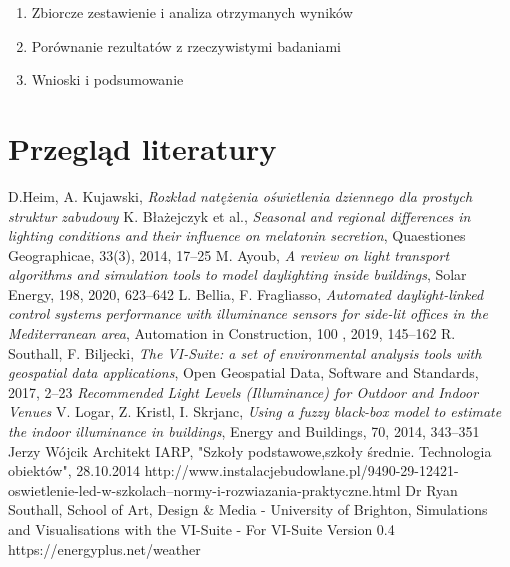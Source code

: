 \documentclass[a4paper,12pt]{article}
\begin{document}
\begin{enumerate}
\begin{table}[h]
\begin{center}
\begin{tabular}{|c|c|c|c|c|c|c|c|c|c|c|c|c|c|c|}
				\end{tabular}
			\end{center}
		\end{table}
		
		
		\item Zbiorcze zestawienie i analiza otrzymanych wyników 
		\item Porównanie rezultatów z rzeczywistymi badaniami
		\item Wnioski i podsumowanie
		
	\end{enumerate}
	
	\section{Przegląd literatury}
	\label{sec:przeglad_literatury}
	\begin{thebibliography}{7}
		D.Heim, A. Kujawski, \textit{Rozkład natężenia oświetlenia dziennego dla prostych struktur zabudowy}
		K. Błażejczyk et al., \textit{Seasonal and regional differences in lighting conditions and their influence on melatonin secretion}, Quaestiones Geographicae, 33(3), 2014, 17--25
		M. Ayoub, \textit{A review on light transport algorithms and simulation tools to model daylighting inside buildings}, Solar Energy, 198, 2020, 623--642
		L. Bellia, F. Fragliasso, \textit{Automated daylight-linked control systems performance with illuminance sensors for side-lit offices in the Mediterranean area}, Automation in Construction, 100 , 2019, 145--162
		R. Southall, F. Biljecki, \textit{The VI-Suite: a set of environmental analysis tools with geospatial data applications}, Open Geospatial Data, Software and Standards, 2017, 2--23
		\textit{Recommended Light Levels (Illuminance) for Outdoor and Indoor Venues}
		V. Logar, Z. Kristl, I. Skrjanc, \textit{Using a fuzzy black-box model to estimate the indoor illuminance in buildings}, Energy and Buildings, 70, 2014, 343--351
		Jerzy Wójcik Architekt IARP, "Szkoły podstawowe,szkoły średnie. Technologia obiektów", 28.10.2014
		http://www.instalacjebudowlane.pl/9490-29-12421-oswietlenie-led-w-szkolach--normy-i-rozwiazania-praktyczne.html
		Dr Ryan Southall, School of Art, Design \& Media - University of Brighton, Simulations and Visualisations with the VI-Suite - For VI-Suite Version 0.4
		https://energyplus.net/weather
		
	\end{thebibliography}
	
\end{document}
